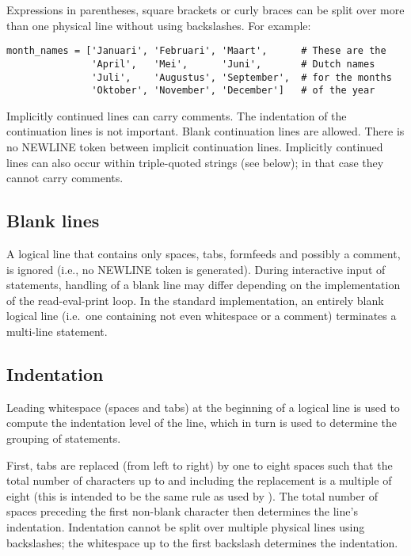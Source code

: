 Expressions in parentheses, square brackets or curly braces can be
split over more than one physical line without using backslashes.
For example:

\begin{verbatim}
month_names = ['Januari', 'Februari', 'Maart',      # These are the
               'April',   'Mei',      'Juni',       # Dutch names
               'Juli',    'Augustus', 'September',  # for the months
               'Oktober', 'November', 'December']   # of the year
\end{verbatim}

Implicitly continued lines can carry comments.  The indentation of the
continuation lines is not important.  Blank continuation lines are
allowed.  There is no NEWLINE token between implicit continuation
lines.  Implicitly continued lines can also occur within triple-quoted
strings (see below); in that case they cannot carry comments.


\subsection{Blank lines \label{blank-lines}}

A logical line that contains only spaces, tabs, formfeeds and possibly
a comment, is ignored (i.e., no NEWLINE token is generated).  During
interactive input of statements, handling of a blank line may differ
depending on the implementation of the read-eval-print loop.  In the
standard implementation, an entirely blank logical line (i.e.\ one
containing not even whitespace or a comment) terminates a multi-line
statement.


\subsection{Indentation\label{indentation}}

Leading whitespace (spaces and tabs) at the beginning of a logical
line is used to compute the indentation level of the line, which in
turn is used to determine the grouping of statements.

First, tabs are replaced (from left to right) by one to eight spaces
such that the total number of characters up to and including the
replacement is a multiple of
eight (this is intended to be the same rule as used by \UNIX{}).  The
total number of spaces preceding the first non-blank character then
determines the line's indentation.  Indentation cannot be split over
multiple physical lines using backslashes; the whitespace up to the
first backslash determines the indentation.

